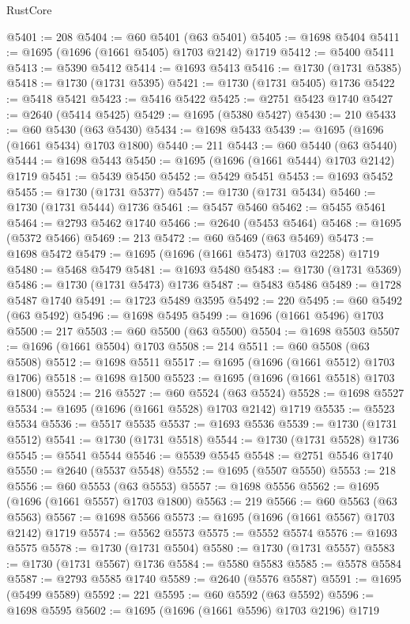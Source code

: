 \begin{lexlean}{RustCore}
\begin{coremodule}
@5401 := 208
@5404 := @60 @5401 (@63 @5401)
@5405 := @1698 @5404
@5411 := @1695 (@1696 (@1661 @5405) @1703 @2142) @1719
@5412 := @5400 @5411
@5413 := @5390 @5412
@5414 := @1693 @5413
@5416 := @1730 (@1731 @5385)
@5418 := @1730 (@1731 @5395)
@5421 := @1730 (@1731 @5405) @1736
@5422 := @5418 @5421
@5423 := @5416 @5422
@5425 := @2751 @5423 @1740
@5427 := @2640 (@5414 @5425)
@5429 := @1695 (@5380 @5427)
@5430 := 210
@5433 := @60 @5430 (@63 @5430)
@5434 := @1698 @5433
@5439 := @1695 (@1696 (@1661 @5434) @1703 @1800)
@5440 := 211
@5443 := @60 @5440 (@63 @5440)
@5444 := @1698 @5443
@5450 := @1695 (@1696 (@1661 @5444) @1703 @2142) @1719
@5451 := @5439 @5450
@5452 := @5429 @5451
@5453 := @1693 @5452
@5455 := @1730 (@1731 @5377)
@5457 := @1730 (@1731 @5434)
@5460 := @1730 (@1731 @5444) @1736
@5461 := @5457 @5460
@5462 := @5455 @5461
@5464 := @2793 @5462 @1740
@5466 := @2640 (@5453 @5464)
@5468 := @1695 (@5372 @5466)
@5469 := 213
@5472 := @60 @5469 (@63 @5469)
@5473 := @1698 @5472
@5479 := @1695 (@1696 (@1661 @5473) @1703 @2258) @1719
@5480 := @5468 @5479
@5481 := @1693 @5480
@5483 := @1730 (@1731 @5369)
@5486 := @1730 (@1731 @5473) @1736
@5487 := @5483 @5486
@5489 := @1728 @5487 @1740
@5491 := @1723 @5489 @3595
@5492 := 220
@5495 := @60 @5492 (@63 @5492)
@5496 := @1698 @5495
@5499 := @1696 (@1661 @5496) @1703
@5500 := 217
@5503 := @60 @5500 (@63 @5500)
@5504 := @1698 @5503
@5507 := @1696 (@1661 @5504) @1703
@5508 := 214
@5511 := @60 @5508 (@63 @5508)
@5512 := @1698 @5511
@5517 := @1695 (@1696 (@1661 @5512) @1703 @1706)
@5518 := @1698 @1500
@5523 := @1695 (@1696 (@1661 @5518) @1703 @1800)
@5524 := 216
@5527 := @60 @5524 (@63 @5524)
@5528 := @1698 @5527
@5534 := @1695 (@1696 (@1661 @5528) @1703 @2142) @1719
@5535 := @5523 @5534
@5536 := @5517 @5535
@5537 := @1693 @5536
@5539 := @1730 (@1731 @5512)
@5541 := @1730 (@1731 @5518)
@5544 := @1730 (@1731 @5528) @1736
@5545 := @5541 @5544
@5546 := @5539 @5545
@5548 := @2751 @5546 @1740
@5550 := @2640 (@5537 @5548)
@5552 := @1695 (@5507 @5550)
@5553 := 218
@5556 := @60 @5553 (@63 @5553)
@5557 := @1698 @5556
@5562 := @1695 (@1696 (@1661 @5557) @1703 @1800)
@5563 := 219
@5566 := @60 @5563 (@63 @5563)
@5567 := @1698 @5566
@5573 := @1695 (@1696 (@1661 @5567) @1703 @2142) @1719
@5574 := @5562 @5573
@5575 := @5552 @5574
@5576 := @1693 @5575
@5578 := @1730 (@1731 @5504)
@5580 := @1730 (@1731 @5557)
@5583 := @1730 (@1731 @5567) @1736
@5584 := @5580 @5583
@5585 := @5578 @5584
@5587 := @2793 @5585 @1740
@5589 := @2640 (@5576 @5587)
@5591 := @1695 (@5499 @5589)
@5592 := 221
@5595 := @60 @5592 (@63 @5592)
@5596 := @1698 @5595
@5602 := @1695 (@1696 (@1661 @5596) @1703 @2196) @1719

\end{coremodule}
\end{lexlean}
